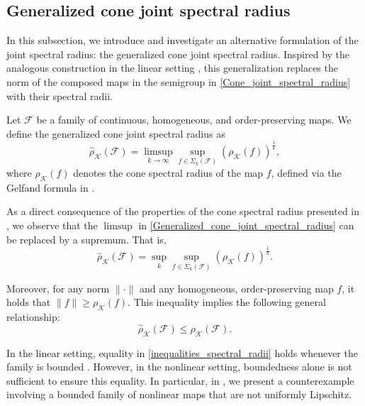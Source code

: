 \documentclass{article}
\newcommand{\family}{\mathcal{F}}
\newcommand{\cradius}{\rho_{\cone}}
\newcommand{\cgradius}{\widehat{\rho}_{\cone}}
\newcommand{\cone}{\mathcal{K}}
\begin{document}







\subsection{Generalized cone joint spectral radius}
\label{Sec:gen_joint_spectral_radius}

In this subsection, we introduce and investigate an alternative formulation of the joint spectral radius: the generalized cone joint spectral radius. Inspired by the analogous construction in the linear setting \cite{BERGER199221}, this generalization replaces the norm of the composed maps in the semigroup in \eqref{Cone_joint_spectral_radius} with their spectral radii.

Let $\family$ be a family of continuous, homogeneous, and order-preserving maps. We define the generalized cone joint spectral radius as
\begin{equation}\label{Generalized_cone_joint_spectral_radius}
    \cgradius(\family) = \limsup_{k \to \infty} \sup_{f \in \Sigma_k(\family)} \left( \cradius(f) \right)^{\frac{1}{k}},
\end{equation}
where $\cradius(f)$ denotes the cone spectral radius of the map $f$, defined via the Gelfand formula in .



As a direct consequence of the properties of the cone spectral radius presented in , we observe that the $\limsup$ in \eqref{Generalized_cone_joint_spectral_radius} can be replaced by a supremum. That is,
\begin{equation}
    \cgradius(\family) = \sup_{k} \sup_{f \in \Sigma_k(\family)} \left( \cradius(f) \right)^{\frac{1}{k}}.
\end{equation}

Moreover, for any norm $\|\cdot\|$ and any homogeneous, order-preserving map $f$, it holds that $\|f\| \geq \cradius(f)$. This inequality implies the following general relationship:
\begin{equation}\label{inequalities_spectral_radii}
    \cgradius(\family) \leq \cradius(\family).
\end{equation}


In the linear setting, equality in \eqref{inequalities_spectral_radii} holds whenever the family is bounded \cite{BERGER199221, shih1997asymptotic, elsner1995generalized}. However, in the nonlinear setting, boundedness alone is not sufficient to ensure this equality. In particular, in , we present a counterexample involving a bounded family of nonlinear maps that are not uniformly Lipschitz. 
\end{document}
